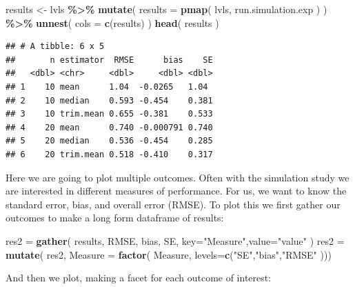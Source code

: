 \documentclass[
]{book}
\newenvironment{Shaded}{\begin{snugshade}}{\end{snugshade}}
\newcommand{\AttributeTok}[1]{\textcolor[rgb]{0.13,0.29,0.53}{#1}}
\newcommand{\FunctionTok}[1]{\textcolor[rgb]{0.13,0.29,0.53}{\textbf{#1}}}
\newcommand{\NormalTok}[1]{#1}
\newcommand{\OtherTok}[1]{\textcolor[rgb]{0.56,0.35,0.01}{#1}}
\newcommand{\SpecialCharTok}[1]{\textcolor[rgb]{0.81,0.36,0.00}{\textbf{#1}}}
\newcommand{\StringTok}[1]{\textcolor[rgb]{0.31,0.60,0.02}{#1}}
\begin{document}
\begin{Shaded}
\begin{Highlighting}[]
\NormalTok{results }\OtherTok{\textless{}{-}}\NormalTok{ lvls }\SpecialCharTok{\%\textgreater{}\%} 
  \FunctionTok{mutate}\NormalTok{( }\AttributeTok{results =} \FunctionTok{pmap}\NormalTok{( lvls, run.simulation.exp ) ) }\SpecialCharTok{\%\textgreater{}\%} 
  \FunctionTok{unnest}\NormalTok{( }\AttributeTok{cols =} \FunctionTok{c}\NormalTok{(results) )}
\FunctionTok{head}\NormalTok{( results )}
\end{Highlighting}
\end{Shaded}

\begin{verbatim}
## # A tibble: 6 x 5
##       n estimator  RMSE      bias    SE
##   <dbl> <chr>     <dbl>     <dbl> <dbl>
## 1    10 mean      1.04  -0.0265   1.04 
## 2    10 median    0.593 -0.454    0.381
## 3    10 trim.mean 0.655 -0.381    0.533
## 4    20 mean      0.740 -0.000791 0.740
## 5    20 median    0.536 -0.454    0.285
## 6    20 trim.mean 0.518 -0.410    0.317
\end{verbatim}

Here we are going to plot multiple outcomes. Often with the simulation study
we are interested in different measures of performance. For us, we want to
know the standard error, bias, and overall error (RMSE). To plot this we
first gather our outcomes to make a long form dataframe of results:

\begin{Shaded}
\begin{Highlighting}[]
\NormalTok{res2 }\OtherTok{=} \FunctionTok{gather}\NormalTok{( results, RMSE, bias, SE, }\AttributeTok{key=}\StringTok{"Measure"}\NormalTok{,}\AttributeTok{value=}\StringTok{"value"}\NormalTok{ )}
\NormalTok{res2 }\OtherTok{=} \FunctionTok{mutate}\NormalTok{( res2, }\AttributeTok{Measure =} \FunctionTok{factor}\NormalTok{( Measure, }\AttributeTok{levels=}\FunctionTok{c}\NormalTok{(}\StringTok{"SE"}\NormalTok{,}\StringTok{"bias"}\NormalTok{,}\StringTok{"RMSE"}\NormalTok{ )))}
\end{Highlighting}
\end{Shaded}

And then we plot, making a facet for each outcome of interest:
\end{document}
